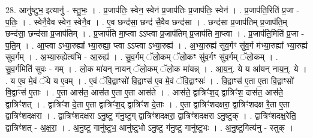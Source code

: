 \documentclass[17pt]{extarticle}
\begin{document}
28. आनु॑ष्टुभ॒ इत्यानु॑ - स्तु॒भः॒ । . प्र॒जाप॑तिः॒ स्वेन॒ स्वेन॑ प्र॒जाप॑तिः प्र॒जाप॑तिः॒ स्वेन॑ । . प्र॒जाप॑ति॒रिति॑ प्र॒जा - प॒तिः॒ । . स्वेनै॒वैव स्वेन॒ स्वेनै॒व । . ए॒व छन्द॑सा॒ छन्द॑ सै॒वैव छन्द॑सा । . छन्द॑सा प्र॒जाप॑तिम् प्र॒जाप॑ति॒म् छन्द॑सा॒ छन्द॑सा प्र॒जाप॑तिम् । . प्र॒जाप॑ति मा॒प्त्वा ऽऽप्त्वा प्र॒जाप॑तिम् प्र॒जाप॑ति मा॒प्त्वा । . प्र॒जाप॑ति॒मिति॑ प्र॒जा - प॒ति॒म् । . आ॒प्त्वा ऽभ्या॒रुह्या᳚ भ्या॒रुह्या॒ प्त्वा ऽऽप्त्वा ऽभ्या॒रुह्य॑ । . अ॒भ्या॒रुह्य॑ सुव॒र्गꣳ सु॑व॒र्ग म॑भ्या॒रुह्या᳚ भ्या॒रुह्य॑ सुव॒र्गम् । . अ॒भ्या॒रुह्येत्य॑भि - आ॒रुह्य॑ । . सु॒व॒र्गम् ॅलो॒कम् ॅलो॒कꣳ सु॑व॒र्गꣳ सु॑व॒र्गम् ॅलो॒कम् । . सु॒व॒र्गमिति॑ सुवः - गम् । . लो॒क मा॑यन् नायन् ॅलो॒कम् ॅलो॒क मा॑यन्न् । . आ॒य॒न्॒. ये य आ॑यन् नाय॒न्॒. ये । . य ए॒व मे॒वं ॅये य ए॒वम् । . ए॒वं ॅवि॒द्वाꣳसो॑ वि॒द्वाꣳस॑ ए॒व मे॒वं ॅवि॒द्वाꣳसः॑ । . वि॒द्वाꣳस॑ ए॒ता ए॒ता वि॒द्वाꣳसो॑ वि॒द्वाꣳस॑ ए॒ताः । . ए॒ता आस॑त॒ आस॑त ए॒ता ए॒ता आस॑ते । . आस॑ते॒ द्वात्रिꣳ॑श॒द् द्वात्रिꣳ॑श॒ दास॑त॒ आस॑ते॒ द्वात्रिꣳ॑शत् । . द्वात्रिꣳ॑श दे॒ता ए॒ता द्वात्रिꣳ॑श॒द् द्वात्रिꣳ॑श दे॒ताः । . ए॒ता द्वात्रिꣳ॑शदक्षरा॒ द्वात्रिꣳ॑शदक्ष रै॒ता ए॒ता द्वात्रिꣳ॑शदक्षरा । . द्वात्रिꣳ॑शदक्षरा ऽनु॒ष्टु ग॑नु॒ष्टुग् द्वात्रिꣳ॑शदक्षरा॒ द्वात्रिꣳ॑शदक्षरा ऽनु॒ष्टुक् । . द्वात्रिꣳ॑शदक्ष॒रेति॒ द्वात्रिꣳ॑शत् - अ॒क्ष॒रा॒ । . अ॒नु॒ष्टु गानु॑ष्टुभ॒ आनु॑ष्टुभो ऽनु॒ष्टु ग॑नु॒ष्टु गानु॑ष्टुभः । . अ॒नु॒ष्टुगित्य॑नु - स्तुक् । \newline
\end{document}

